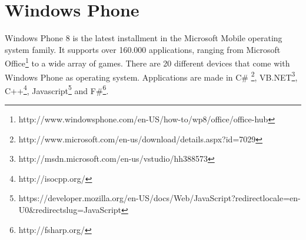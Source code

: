 \section{Windows Phone}
Windows Phone 8 is the latest installment in the Microsoft Mobile operating system family. It supports over 160.000 applications, ranging from Microsoft Office\footnote{http://www.windowsphone.com/en-US/how-to/wp8/office/office-hub} to a wide array of games. There are 20 different devices that come with Windows Phone as operating system. 
Applications are made in C\# \footnote{http://www.microsoft.com/en-us/download/details.aspx?id=7029}, VB.NET\footnote{http://msdn.microsoft.com/en-us/vstudio/hh388573}, C++\footnote{http://isocpp.org/}, Javascript\footnote{https://developer.mozilla.org/en-US/docs/Web/JavaScript?redirectlocale=en-U0\&redirectslug=JavaScript} and F\#\footnote{http://fsharp.org/}.
